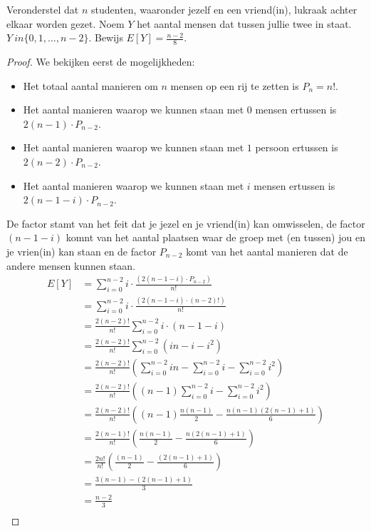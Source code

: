 \documentclass[main.tex]{subfiles}
\begin{document}
\begin{oef}
  Veronderstel dat $n$ studenten, waaronder jezelf en een vriend(in), lukraak achter elkaar worden gezet.
  Noem $Y$ het aantal mensen dat tussen jullie twee in staat. $Y \
in \{ 0,1,\dotsc,n-2 \}$.
  Bewijs $E[Y] =\frac{n-2}{8}$.

\begin{proof}
    We bekijken eerst de mogelijkheden:
    \begin{itemize}
    \item Het totaal aantal manieren om $n$ mensen op een rij te zetten is $P_{n}=n!$.
    \item Het aantal manieren waarop we kunnen staan met $0$ mensen ertussen is $2(n-1) \cdot P_{n-2}$.
    \item Het aantal manieren waarop we kunnen staan met $1$ persoon ertussen is $2(n-2) \cdot P_{n-2}$.
    \item Het aantal manieren waarop we kunnen staan met $i$ mensen ertussen is $2(n-1-i) \cdot P_{n-2}$.
    \end{itemize}
    De factor stamt van het feit dat je jezel en je vriend(in) kan omwisselen, de factor $(n-1-i)$ komnt van het aantal plaatsen waar de groep met (en tussen) jou en je vrien(in) kan staan en de factor $P_{n-2}$ komt van het aantal manieren dat de andere mensen kunnen staan.
    \[ 
    \begin{array}{rl}
    E[Y]
    &= \sum_{i=0}^{n-2}i \cdot \frac{\left( 2(n-1-i) \cdot P_{n-2} \right)}{n!}\\
    &= \sum_{i=0}^{n-2}i \cdot \frac{\left( 2(n-1-i) \cdot (n-2)! \right)}{n!}\\
    &= \frac{2(n-2)!}{n!}\sum_{i=0}^{n-2}i \cdot (n-1-i)\\
    &= \frac{2(n-2)!}{n!}\sum_{i=0}^{n-2}(in- i-i^{2})\\
    &= \frac{2(n-2)!}{n!}\left(\sum_{i=0}^{n-2}in- \sum_{i=0}^{n-2}i-\sum_{i=0}^{n-2}i^{2}\right)\\
    &= \frac{2(n-2)!}{n!}\left((n-1)\sum_{i=0}^{n-2}i-\sum_{i=0}^{n-2}i^{2}\right)\\
    &= \frac{2(n-2)!}{n!}\left((n-1)\frac{n(n-1)}{2}-\frac{n(n-1)(2(n-1)+1)}{6}\right)\\
    &= \frac{2(n-1)!}{n!}\left(\frac{n(n-1)}{2}-\frac{n(2(n-1)+1)}{6}\right)\\
    &= \frac{2n!}{n!}\left(\frac{(n-1)}{2}-\frac{(2(n-1)+1)}{6}\right)\\
    &= \frac{3(n-1)-(2(n-1)+1)}{3}\\
    &= \frac{n-2}{3}\\

\end{array}\]
\end{proof}
\end{oef}
\end{document}
